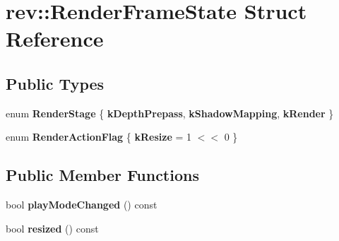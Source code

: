 \hypertarget{structrev_1_1_render_frame_state}{}\section{rev\+::Render\+Frame\+State Struct Reference}
\label{structrev_1_1_render_frame_state}
\subsection*{Public Types}
\begin{DoxyCompactItemize}
\item 
\mbox{\label{structrev_1_1_render_frame_state_a71b3a015217f4c0b5ec39e30c89e02dd}} 
enum {\bfseries Render\+Stage} \{ {\bfseries k\+Depth\+Prepass}, 
{\bfseries k\+Shadow\+Mapping}, 
{\bfseries k\+Render}
 \}
\item 
\mbox{\label{structrev_1_1_render_frame_state_a6e82946c19a8083326bbf53d0b30f9de}} 
enum {\bfseries Render\+Action\+Flag} \{ {\bfseries k\+Resize} = 1 $<$$<$ 0
 \}
\end{DoxyCompactItemize}
\subsection*{Public Member Functions}
\begin{DoxyCompactItemize}
\item 
\mbox{\label{structrev_1_1_render_frame_state_af36a8d4bfc8e8bc447fead1b9fe776fa}} 
bool {\bfseries play\+Mode\+Changed} () const
\item 
\mbox{\label{structrev_1_1_render_frame_state_ae350660edc6e8d08c34acf7c65f2b404}} 
bool {\bfseries resized} () const
\end{DoxyCompactItemize}
